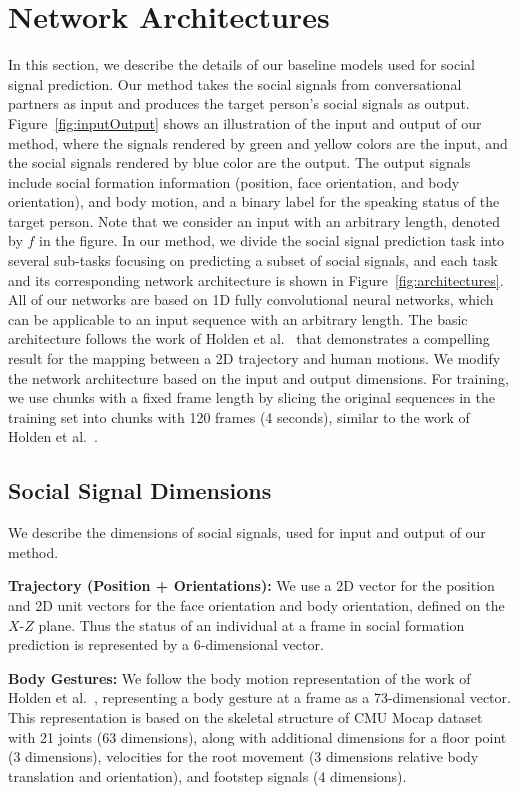 
\section{Network Architectures}

In this section, we describe the details of our baseline models used for social signal prediction. Our method takes the social signals from conversational partners as input and produces the target person's social signals as output. Figure~\ref{fig:inputOutput} shows an illustration of the input and output of our method, where the signals rendered by green and yellow colors are the input, and the social signals rendered by blue color are the output. The output signals include social formation information (position, face orientation, and body orientation), and body motion, and a binary label for the speaking status of the target person. Note that we consider an input with an arbitrary length, denoted by $f$ in the figure. In our method, we divide the social signal prediction task into several sub-tasks focusing on predicting a subset of social signals, and each task and its corresponding network architecture is shown in Figure~\ref{fig:architectures}. All of our networks are based on 1D fully convolutional neural networks, which can be applicable to an input sequence with an arbitrary length. The basic architecture follows the work of Holden et al.~\cite{holden2016deep} that demonstrates a compelling result for the mapping between a 2D trajectory and human motions. We modify the network architecture based on the input and output dimensions. For training, we use chunks with a fixed frame length by slicing the original sequences in the training set into chunks with 120 frames (4 seconds), similar to the work of Holden et al.~\cite{holden2016deep}.

\subsection{Social Signal Dimensions}
We describe the dimensions of social signals, used for input and output of our method.

\noindent \textbf{Trajectory (Position + Orientations):} We use a 2D vector for the position and 2D unit vectors for the face orientation and body orientation, defined on the $X$-$Z$ plane. Thus the status of an individual at a frame in social formation prediction is represented by a 6-dimensional vector.

\noindent \textbf{Body Gestures:} We follow the body motion representation of the work of Holden et al.~\cite{holden2016deep}, representing a body gesture at a frame as a 73-dimensional vector. This representation is based on the skeletal structure of CMU Mocap dataset~\cite{CMUMocap} with 21 joints (63 dimensions), along with additional dimensions for a floor point (3 dimensions), velocities for the root movement (3 dimensions relative body translation and orientation), and footstep signals (4 dimensions). 

